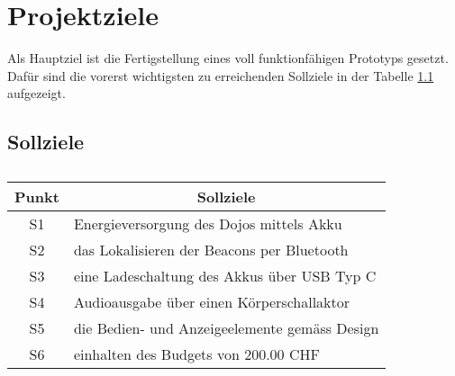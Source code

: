 \chapter{Projektziele}
\thispagestyle{fancy} 
Als Hauptziel ist die Fertigstellung eines voll funktionfähigen Prototyps gesetzt. Dafür sind die vorerst wichtigsten zu erreichenden Sollziele in der Tabelle \ref{tab:sollziele} aufgezeigt.\\
\section*{Sollziele}
\begin{table}[h]
\centering
	\begin{tabular}{c|c|l}
	\toprule 
	\textbf{Punkt} & \multicolumn{2}{c}{\textbf{Sollziele}} \\
	\hline
	S1 & \multicolumn{2}{l}{Energieversorgung des Dojos mittels Akku} \\
	\hline
	S2 & \multicolumn{2}{l}{das Lokalisieren der Beacons per Bluetooth} \\
	\hline
	S3 & \multicolumn{2}{l}{eine Ladeschaltung des Akkus über USB Typ C} \\
	\hline
	S4 & \multicolumn{2}{l}{Audioausgabe über einen Körperschallaktor} \\
	\hline
	S5 & \multicolumn{2}{l}{die Bedien- und Anzeigeelemente gemäss Design} \\
	\hline
	S6 & \multicolumn{2}{l}{einhalten des Budgets von 200.00 CHF} \\
	\bottomrule 
	\end{tabular}
\caption{}
\label{tab:sollziele}
\end{table}

